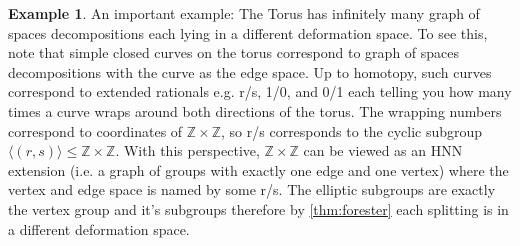 \documentclass[12pt,parskip=full]{report}
\theoremstyle{plain}
\theoremstyle{definition}
\newtheorem{exa}[thm]{Example}
\begin{document}
\begin{exa}

An important example: The Torus has infinitely many graph of spaces decompositions each lying in a different deformation space. To see this, note that simple closed curves on the torus correspond to graph of spaces decompositions with the curve as the edge space. Up to homotopy, such curves correspond to extended rationals e.g. r/s, 1/0, and 0/1 each telling you how many times a curve wraps around both directions of the torus. The wrapping numbers correspond to coordinates of \(\mathbb{Z}\times \mathbb{Z}\), so r/s corresponds to the cyclic subgroup \(\langle (r,s)\rangle\leq \mathbb{Z}\times \mathbb{Z}\). With this perspective, \(\mathbb{Z}\times \mathbb{Z}\) can be viewed as an HNN extension (i.e. a graph of groups with exactly one edge and one vertex) where the vertex and edge space is named by some r/s. The elliptic subgroups are exactly the vertex group and it's subgroups therefore by  \ref{thm:forester} each splitting is in a different deformation space.











\end{exa}



\end{document}
